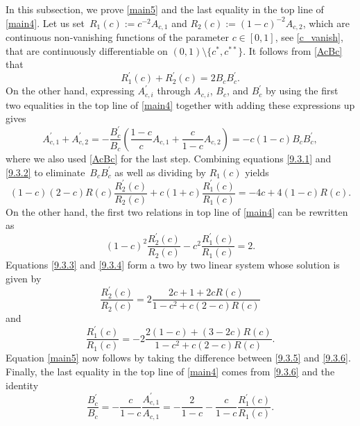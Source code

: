 \documentclass[pdftex]{sigma}
\numberwithin{equation}{section}
\begin{document}
In this subsection, we prove \eqref{main5} and the last equality in the top line of \eqref{main4}. Let us set~${ R_1(c) := c^{-2}A_{c,1}} $ and $ R_2(c) := (1-c)^{-2}A_{c,2} $, which are continuous non-vanishing functions of the parameter $ c\in[0,1] $, see \eqref{c_vanish}, that are continuously differentiable on $ (0,1)\setminus\{c^*,c^{**}\}$. It follows from \eqref{AcBc} that
\begin{equation}
\label{9.3.1}
R_1^\prime(c) + R_2^\prime(c) = 2B_cB_c^\prime.
\end{equation}
On the other hand, expressing $ A_{c,i}^\prime $ through $ A_{c,i} $, $ B_c $, and $B_c^\prime $ by using the first two equalities in the top line of \eqref{main4} together with adding these expressions up gives
\begin{equation}
\label{9.3.2}
A_{c,1}^\prime + A_{c,2}^\prime = -\frac{B_c^\prime}{B_c}\left( \frac{1-c}c A_{c,1} + \frac c{1-c} A_{c,2} \right) = -c(1-c) B_c B_c^\prime,
\end{equation}
where we also used \eqref{AcBc} for the last step. Combining equations \eqref{9.3.1} and \eqref{9.3.2} to eliminate~$ B_cB_c^\prime $ as well as dividing by $ R_1(c) $ yields
\begin{equation}
\label{9.3.3}
(1-c)(2-c)R(c)\frac{R_2^\prime(c)}{R_2(c)} + c(1+c)\frac{R_1^\prime(c)}{R_1(c)} = -4c + 4(1-c)R(c).
\end{equation}
On the other hand, the first two relations in top line of \eqref{main4} can be rewritten as
\begin{equation}
\label{9.3.4}
(1-c)^2\frac{R_2^\prime(c)}{R_2(c)} - c^2\frac{R_1^\prime(c)}{R_1(c)} = 2.
\end{equation}
Equations \eqref{9.3.3} and \eqref{9.3.4} form a two by two linear system whose solution is given by
\begin{equation}
\label{9.3.5}
\frac{R_2^\prime(c)}{R_2(c)} = 2\frac{2c+1+2cR(c)}{1-c^2+c(2-c)R(c)}
\end{equation}
and
\begin{equation}
\label{9.3.6}
\frac{R_1^\prime(c)}{R_1(c)} = -2\frac{2(1-c)+(3-2c)R(c)}{1-c^2+c(2-c)R(c)}.
\end{equation}
Equation \eqref{main5} now follows by taking the difference between \eqref{9.3.5} and \eqref{9.3.6}. Finally, the last equality in the top line of \eqref{main4} comes from \eqref{9.3.6} and the identity
\[
\frac{B_c^\prime}{B_c} = -\frac c{1-c} \frac{A_{c,1}^\prime}{A_{c,1}} = -\frac2{1-c} - \frac c{1-c}\frac{R_1^\prime(c)}{R_1(c)}.
\]
\end{document}
